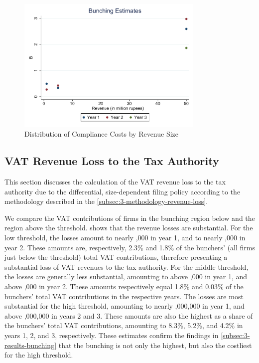 \begin{figure}[ht!]
  \caption{Distribution of Compliance Costs by Revenue Size}
  \label{fig:ComplianceCosts}
  \includegraphics[width=0.8\textwidth]{graphs/BunchingEstimates} 
\end{figure}


\subsection{VAT Revenue Loss to the Tax Authority}
\label{subsec:3-results-revenue-loss}
This section discusses the calculation of the VAT revenue loss to the tax authority due to the differential, size-dependent filing policy according to the methodology described in the \cref{subsec:3-methodology-revenue-loss}.

We compare the VAT contributions of firms in the bunching region below and the region above the threshold.  shows that the revenue losses are substantial. For the low threshold, the losses amount to nearly ,000 in year 1, and to nearly ,000 in year 2. These amounts are, respectively, 2.3\% and 1.8\% of the bunchers' (all firms just below the threshold) total VAT contributions, therefore presenting a substantial loss of VAT revenues to the tax authority. For the middle threshold, the losses are generally less substantial, amounting to above ,000 in year 1, and above ,000 in year 2. These amounts respectively equal 1.8\% and 0.03\% of the bunchers' total VAT contributions in the respective years. The losses are most substantial for the high threshold, amounting to nearly ,000,000 in year 1, and above ,000,000 in years 2 and 3. These amounts are also the highest as a share of the bunchers' total VAT contributions, amounting to 8.3\%, 5.2\%,
and 4.2\% in years 1, 2, and 3, respectively. These estimates confirm the findings in \cref{subsec:3-results-bunching} that the bunching is not only the highest, but also the costliest for the high threshold.


